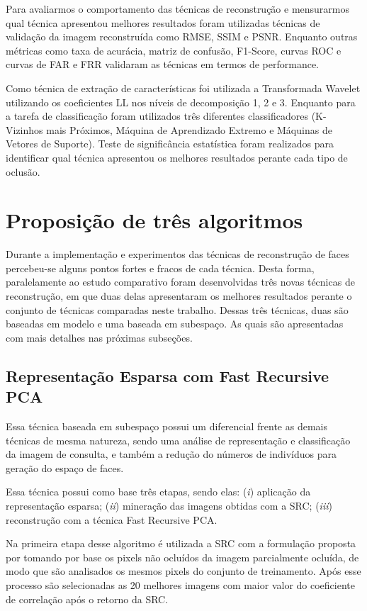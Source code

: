 Para avaliarmos o comportamento das técnicas de reconstrução e mensurarmos qual técnica apresentou melhores resultados foram utilizadas técnicas de validação da imagem reconstruída como RMSE, SSIM e PSNR. Enquanto outras métricas como taxa de acurácia, matriz de confusão, F1-Score, curvas ROC e curvas de FAR e FRR validaram as técnicas em termos de performance. 

Como técnica de extração de características foi utilizada a Transformada Wavelet utilizando os coeficientes LL nos níveis de decomposição 1, 2 e 3. Enquanto para a tarefa de classificação foram utilizados três diferentes classificadores (K-Vizinhos mais Próximos, Máquina de Aprendizado Extremo e Máquinas de Vetores de Suporte). Teste de significância estatística foram realizados para identificar qual técnica apresentou os melhores resultados perante cada tipo de oclusão.



\section{Proposição de três algoritmos}

Durante a implementação e experimentos das técnicas de reconstrução de faces percebeu-se alguns pontos fortes e fracos de cada técnica. Desta forma, paralelamente ao estudo comparativo foram desenvolvidas três novas técnicas de reconstrução, em que duas delas apresentaram os melhores resultados perante o conjunto de técnicas comparadas neste trabalho. Dessas três técnicas, duas são baseadas em modelo e uma baseada em subespaço. As quais são apresentadas com mais detalhes nas próximas subseções.


\subsection{Representação Esparsa com Fast Recursive PCA}

Essa técnica baseada em subespaço possui um diferencial frente as demais técnicas de mesma natureza, sendo uma análise de representação e classificação da imagem de consulta, e também a redução do números de indivíduos para geração do espaço de faces.

Essa técnica possui como base três etapas, sendo elas: (\textit{i}) aplicação da representação esparsa; (\textit{ii}) mineração das imagens obtidas com a SRC; (\textit{iii}) reconstrução com a técnica Fast Recursive PCA. 

Na primeira etapa desse algoritmo é utilizada a SRC com a formulação proposta por  tomando por base os pixels não ocluídos da imagem parcialmente ocluída, de modo que são analisados os mesmos pixels do conjunto de treinamento. Após esse processo são selecionadas as 20 melhores imagens com maior valor do coeficiente de correlação após o retorno da SRC.


